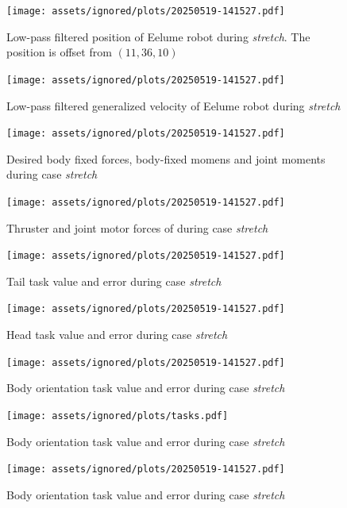 \begin{figure}[!ht]
    \centering
    \texttt{[image: assets/ignored/plots/20250519-141527.pdf]}
    \caption[Low-pass filtered position of Eelume robot during \textit{stretch} case with \gls{tpc}]
    {Low-pass filtered position of Eelume robot during \textit{stretch}. The position is offset from \((11, 36, 10)\)}
    \label{fig:results:tpc:stretch:1:pos}
\end{figure}
\begin{figure}[!ht]
    \centering
    \texttt{[image: assets/ignored/plots/20250519-141527.pdf]}
    \caption{Low-pass filtered generalized velocity of Eelume robot during \textit{stretch}}
    \label{fig:results:tpc:stretch:1:vel}
\end{figure}
\begin{figure}[!ht]
    \centering
    \texttt{[image: assets/ignored/plots/20250519-141527.pdf]}
    \caption{Desired body fixed forces, body-fixed momens and joint moments during case \textit{stretch}}
    \label{fig:results:tpc:stretch:1:forces}
\end{figure}
\begin{figure}[!ht]
    \centering
    \texttt{[image: assets/ignored/plots/20250519-141527.pdf]}
    \caption{Thruster and joint motor forces of during case \textit{stretch}}
    \label{fig:results:tpc:stretch:1:forces-torques}
\end{figure}
\begin{figure}[!ht]
    \centering
    \texttt{[image: assets/ignored/plots/20250519-141527.pdf]}
    \caption{Tail task value and error during case \textit{stretch}}
    \label{fig:results:tpc:stretch:1:task:1}
\end{figure}
\begin{figure}[!ht]
    \centering
    \texttt{[image: assets/ignored/plots/20250519-141527.pdf]}
    \caption{Head task value and error during case \textit{stretch}}
    \label{fig:results:tpc:stretch:1:task:2}
\end{figure}
\begin{figure}[!ht]
    \centering
    \texttt{[image: assets/ignored/plots/20250519-141527.pdf]}
    \caption{Body orientation task value and error during case \textit{stretch}}
    \label{fig:results:tpc:stretch:1:task:3}
\end{figure}
\begin{figure}[!ht]
    \centering
    \texttt{[image: assets/ignored/plots/tasks.pdf]}
    \caption{Body orientation task value and error during case \textit{stretch}}
    \label{fig:results:tpc:stretch:task-traj}
\end{figure}
\begin{figure}[!ht]
    \centering
    \texttt{[image: assets/ignored/plots/20250519-141527.pdf]}
    \caption{Body orientation task value and error during case \textit{stretch}}
    \label{fig:results:tpc:stretch:dp-tracking}
\end{figure}



